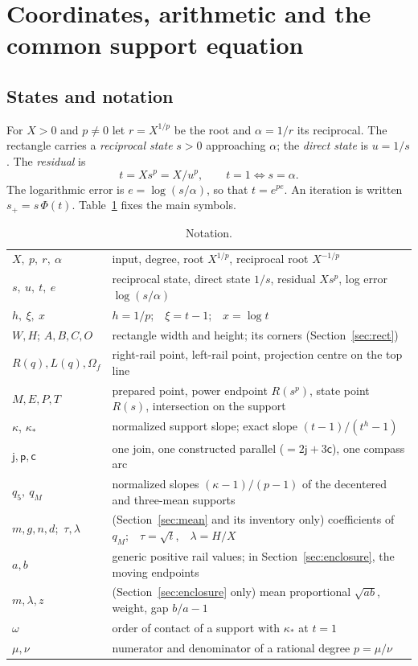 \documentclass[10pt,a4paper]{article}
\theoremstyle{plain}
\theoremstyle{remark}
\numberwithin{equation}{section}
\newcommand{\jn}{\mathsf{j}}          %
\newcommand{\pl}{\mathsf{p}}          %
\newcommand{\ar}{\mathsf{c}}          %
\newcommand{\Om}{\Omega}              %
\begin{document}
\section{Coordinates, arithmetic and the common support equation}\label{sec:coords}

\subsection{States and notation}

For $X>0$ and $p\neq 0$ let $r=X^{1/p}$ be the root and $\alpha=1/r$ its reciprocal. The rectangle
carries a \emph{reciprocal state} $s>0$ approaching $\alpha$; the \emph{direct state} is $u=1/s$. The
\emph{residual} is
\[ t=Xs^{p}=X/u^{p}, \qquad t=1 \iff s=\alpha . \]
The logarithmic error is $e=\log(s/\alpha)$, so that $t=e^{pe}$. An iteration is written
$s_+=s\,\Phi(t)$. Table~\ref{tab:notation} fixes the main symbols.

\begin{table}[h]
\centering\small
\caption{Notation.}\label{tab:notation}
\begin{tabularx}{\linewidth}{@{}lX@{}}
\toprule
$X,\ p,\ r,\ \alpha$ & input, degree, root $X^{1/p}$, reciprocal root $X^{-1/p}$\\
$s,\ u,\ t,\ e$ & reciprocal state, direct state $1/s$, residual $Xs^p$, log error $\log(s/\alpha)$\\
$h,\ \xi,\ x$ & $h=1/p$;\ \ $\xi=t-1$;\ \ $x=\log t$\\
$W,H$; $A,B,C,O$ & rectangle width and height; its corners (Section~\ref{sec:rect})\\
$R(q),L(q),\Om_f$ & right-rail point, left-rail point, projection centre on the top line\\
$M,E,P,T$ & prepared point, power endpoint $R(s^{p})$, state point $R(s)$, intersection on the support\\
$\kappa$, $\kappa_*$ & normalized support slope; exact slope $(t-1)/(t^{h}-1)$\\
$\jn,\pl,\ar$ & one join, one constructed parallel ($=2\jn+3\ar$), one compass arc\\
$q_5,\ q_M$ & normalized slopes $(\kappa-1)/(p-1)$ of the decentered and three-mean supports\\
$m,g,n,d$;\ $\tau,\lambda$ & (Section~\ref{sec:mean} and its inventory only) coefficients of $q_M$;\ \ $\tau=\sqrt t$,\ \ $\lambda=H/X$\\
$a,b$ & generic positive rail values; in Section~\ref{sec:enclosure}, the moving endpoints\\
$m,\lambda,z$ & (Section~\ref{sec:enclosure} only) mean proportional $\sqrt{ab}$, weight, gap $b/a-1$\\
$\omega$ & order of contact of a support with $\kappa_*$ at $t=1$\\
$\mu,\nu$ & numerator and denominator of a rational degree $p=\mu/\nu$\\
\bottomrule
\end{tabularx}
\end{table}
\end{document}

